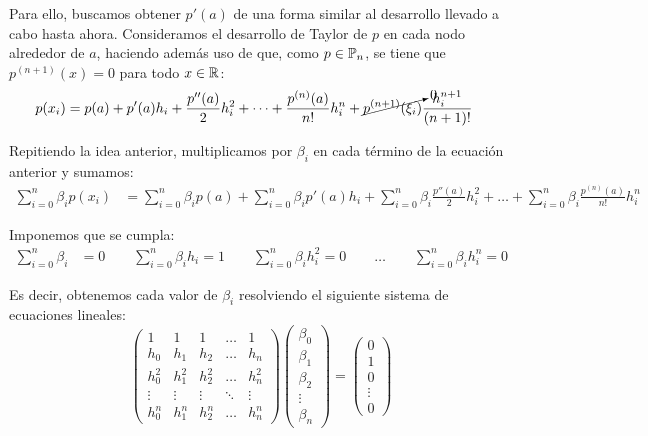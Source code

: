 \begin{ejercicio}
    Para ello, buscamos obtener $p'(a)$ de una forma similar al desarrollo llevado a cabo hasta ahora. Consideramos el desarrollo de Taylor de $p$ en cada nodo alrededor de $a$, haciendo además uso de que, como $p\in \mathbb{P}_n$, se tiene que $p^{(n+1)}(x)=0$ para todo $x\in \mathbb{R}$:
    \begin{align*}
        p(x_i) &= p(a) + p'(a)h_i + \frac{p''(a)}{2}h_i^2 + \dots + \frac{p^{(n)}(a)}{n!}h_i^n + \cancelto{0}{p^{(n+1)}(\xi_i)}\frac{h_i^{n+1}}{(n+1)!}
    \end{align*}

    Repitiendo la idea anterior, multiplicamos por $\beta_i$ en cada término de la ecuación anterior y sumamos:
    \begin{align*}
        \sum_{i=0}^n \beta_i p(x_i) &= \sum_{i=0}^n \beta_i p(a) + \sum_{i=0}^n \beta_i p'(a)h_i + \sum_{i=0}^n \beta_i \frac{p''(a)}{2}h_i^2 + \dots + \sum_{i=0}^n \beta_i \frac{p^{(n)}(a)}{n!}h_i^n
    \end{align*}

    Imponemos que se cumpla:
    \begin{align*}
        \sum_{i=0}^n \beta_i &= 0\qquad 
        \sum_{i=0}^n \beta_i h_i = 1\qquad
        \sum_{i=0}^n \beta_i h_i^2 = 0\qquad
        \dots\qquad
        \sum_{i=0}^n \beta_i h_i^n = 0
    \end{align*}

    Es decir, obtenemos cada valor de $\beta_i$ resolviendo el siguiente sistema de ecuaciones lineales:
    \begin{equation}\label{eq:2}
        \begin{pmatrix}
            1 & 1 & 1 & \dots & 1\\
            h_0 & h_1 & h_2 & \dots & h_n\\
            h_0^2 & h_1^2 & h_2^2 & \dots & h_n^2\\
            \vdots & \vdots & \vdots & \ddots & \vdots\\
            h_0^n & h_1^n & h_2^n & \dots & h_n^n
        \end{pmatrix}
        \begin{pmatrix}
            \beta_0\\
            \beta_1\\
            \beta_2\\
            \vdots\\
            \beta_n
        \end{pmatrix}
        =
        \begin{pmatrix}
            0\\
            1\\
            0\\
            \vdots\\
            0
        \end{pmatrix}
    \end{equation}


\end{ejercicio}
